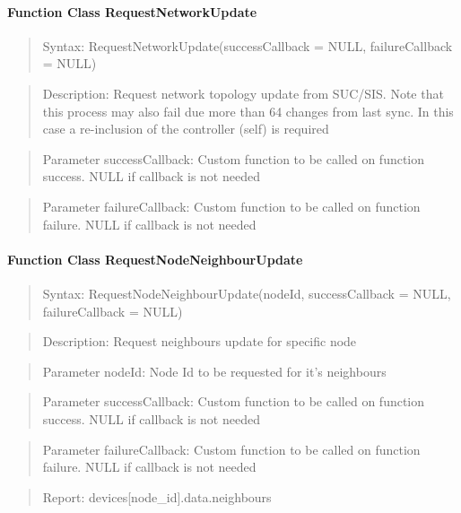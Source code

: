 \paragraph{Function Class RequestNetworkUpdate}
\begin{quote}Syntax: RequestNetworkUpdate(successCallback = NULL, failureCallback = NULL)\end{quote}
\begin{quote}Description: Request network topology update from SUC/SIS. Note that this process may also fail due more than 64 changes from last sync. In this case a re-inclusion of the controller (self) is required\end{quote}
\begin{quote}Parameter successCallback: Custom function to be called on function success. NULL if callback is not needed\end{quote}
\begin{quote}Parameter failureCallback: Custom function to be called on function failure. NULL if callback is not needed\end{quote}


\paragraph{Function Class RequestNodeNeighbourUpdate}
\begin{quote}Syntax: RequestNodeNeighbourUpdate(nodeId, successCallback = NULL, failureCallback = NULL)\end{quote}
\begin{quote}Description: Request neighbours update for specific node\end{quote}
\begin{quote}Parameter nodeId: Node Id to be requested for it's neighbours\end{quote}
\begin{quote}Parameter successCallback: Custom function to be called on function success. NULL if callback is not needed\end{quote}
\begin{quote}Parameter failureCallback: Custom function to be called on function failure. NULL if callback is not needed\end{quote}
\begin{quote}Report: devices[node\_id].data.neighbours\end{quote}

